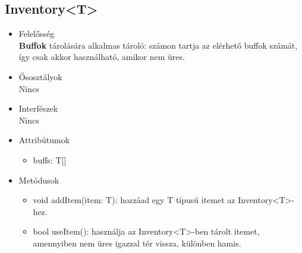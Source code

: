 \subsection{Inventory<T>}
\begin{itemize}

\item Felelősség\\
    \textbf{Buffok} tárolására alkalmas tároló: számon tartja az elérhető buffok számát, így csak akkor használható, amikor nem üres.

\item Ősosztályok\\
Nincs

\item Interfészek\\
Nincs

\item Attribútumok\\
\begin{itemize}
    \item buffs: T[]
\end{itemize}

\item Metódusok\\

\begin{itemize}
    \item void addItem(item: T): hozzáad egy T típusú itemet az Inventory<T>-hez.
    \item bool useItem(): használja az Inventory<T>-ben tárolt itemet, amennyiben nem üres igazzal tér vissza, különben hamis.
\end{itemize}

\end{itemize}

